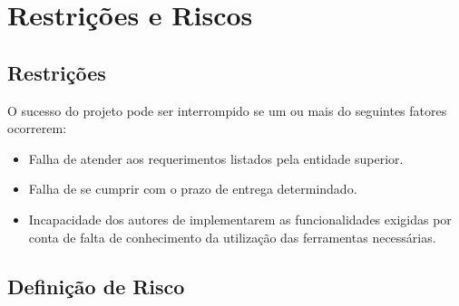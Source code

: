 \chapter{Restrições e Riscos}

\section{Restrições}
    O sucesso do projeto pode ser interrompido se um ou mais do seguintes fatores ocorrerem:
    \begin{itemize}
        \item Falha de atender aos requerimentos listados pela entidade superior.
        \item Falha de se cumprir com o prazo de entrega determindado.
        \item Incapacidade dos autores de implementarem as funcionalidades exigidas por conta de falta de conhecimento da utilização das ferramentas necessárias.
    \end{itemize}


\section{Definição de Risco}

